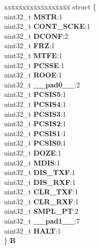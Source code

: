 \begin{DoxyCompactItemize}
\begin{tabbing}
\end{tabbing}\item 
\mbox{\label{unionDSPI__tag_1_1DSPI__MCR__tag_ab1c6260aceeb604942cc41777b30b87c}} 
\begin{tabbing}
xx\=xx\=xx\=xx\=xx\=xx\=xx\=xx\=xx\=\kill
struct \{\\
\>uint32\_t {\bfseries MSTR}:1\\
\>uint32\_t {\bfseries CONT\_SCKE}:1\\
\>uint32\_t {\bfseries DCONF}:2\\
\>uint32\_t {\bfseries FRZ}:1\\
\>uint32\_t {\bfseries MTFE}:1\\
\>uint32\_t {\bfseries PCSSE}:1\\
\>uint32\_t {\bfseries ROOE}:1\\
\>uint32\_t {\bfseries \_\_pad0\_\_}:2\\
\>uint32\_t {\bfseries PCSIS5}:1\\
\>uint32\_t {\bfseries PCSIS4}:1\\
\>uint32\_t {\bfseries PCSIS3}:1\\
\>uint32\_t {\bfseries PCSIS2}:1\\
\>uint32\_t {\bfseries PCSIS1}:1\\
\>uint32\_t {\bfseries PCSIS0}:1\\
\>uint32\_t {\bfseries DOZE}:1\\
\>uint32\_t {\bfseries MDIS}:1\\
\>uint32\_t {\bfseries DIS\_TXF}:1\\
\>uint32\_t {\bfseries DIS\_RXF}:1\\
\>uint32\_t {\bfseries CLR\_TXF}:1\\
\>uint32\_t {\bfseries CLR\_RXF}:1\\
\>uint32\_t {\bfseries SMPL\_PT}:2\\
\>uint32\_t {\bfseries \_\_pad1\_\_}:7\\
\>uint32\_t {\bfseries HALT}:1\\
\} {\bfseries B}\\


\end{tabbing}
\end{DoxyCompactItemize}
